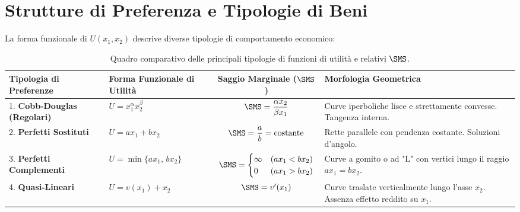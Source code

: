 \section{Strutture di Preferenza e Tipologie di Beni}

La forma funzionale di $U(x_1, x_2)$ descrive diverse tipologie di comportamento economico:

\begin{table}[htbp]
\centering
\small
\renewcommand{\arraystretch}{1.4}
\begin{tabularx}{\textwidth}{l X c X}
\toprule
\textbf{Tipologia di Preferenze} & \textbf{Forma Funzionale di Utilità} & \textbf{Saggio Marginale ($\SMS$)} & \textbf{Morfologia Geometrica} \\
\midrule
1. \textbf{Cobb-Douglas (Regolari)} & $U = x_1^\alpha x_2^\beta$ & $\SMS = \dfrac{\alpha x_2}{\beta x_1}$ & Curve iperboliche lisce e strettamente convesse. Tangenza interna. \\
2. \textbf{Perfetti Sostituti} & $U = a x_1 + b x_2$ & $\SMS = \dfrac{a}{b} = \text{costante}$ & Rette parallele con pendenza costante. Soluzioni d'angolo. \\
3. \textbf{Perfetti Complementi} & $U = \min\{a x_1, \, b x_2\}$ & $\SMS = \begin{cases} \infty & (ax_1 < bx_2) \\ 0 & (ax_1 > bx_2) \end{cases}$ & Curve a gomito o ad "L" con vertici lungo il raggio $a x_1 = b x_2$. \\
4. \textbf{Quasi-Lineari} & $U = v(x_1) + x_2$ & $\SMS = v'(x_1)$ & Curve traslate verticalmente lungo l'asse $x_2$. Assenza effetto reddito su $x_1$. \\
\bottomrule
\end{tabularx}
\caption{Quadro comparativo delle principali tipologie di funzioni di utilità e relativi $\SMS$.}
\label{tab:tipologie_preferenze}
\end{table}


